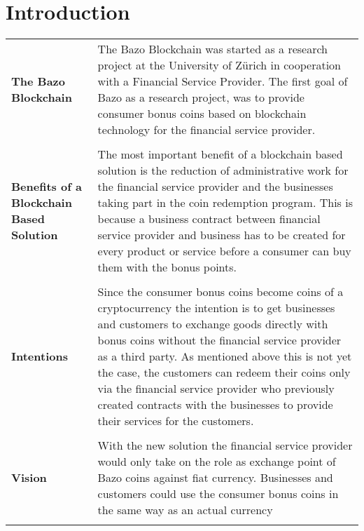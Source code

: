 \chapter{Introduction}
\thispagestyle{main} %

\begin{tabular}[t]{ p{3cm} p{12.5cm}}

\raggedright
\textbf{The Bazo Blockchain} &
The Bazo Blockchain was started as a research project at the University of Zürich in cooperation with a Financial Service Provider. The first goal of Bazo as a research project, was to provide consumer bonus coins based on blockchain technology for the financial service provider. \\ \\

\raggedright
\textbf{Benefits of a Blockchain Based Solution} &
The most important benefit of a blockchain based solution is the reduction of administrative work for the financial service provider and the businesses taking part in the coin redemption program. This is because a business contract between financial service provider and business has to be created for every product or service before a consumer can buy them with the bonus points.  \\ \\

\textbf{Intentions} &
Since the consumer bonus coins become coins of a cryptocurrency the intention is to get businesses and customers to exchange goods directly with bonus coins without the financial service provider as a third party. As mentioned above this is not yet the case, the customers can redeem their coins only via the financial service provider who previously created contracts with the businesses to provide their services for the customers. \\ \\

\textbf{Vision} &
With the new solution the financial service provider would only take on the role as exchange point of Bazo coins against fiat currency. Businesses and customers could use the consumer bonus coins in the same way as an actual currency \\ \\


\end{tabular}
